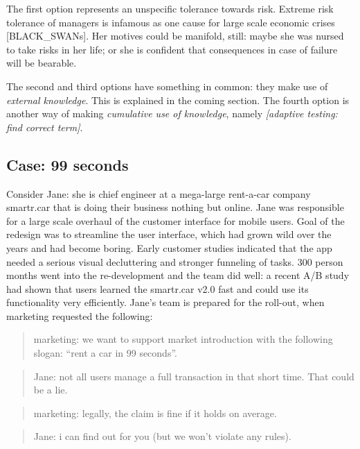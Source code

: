 \documentclass[]{svmono}
\theoremstyle{definition}
\theoremstyle{definition}
\theoremstyle{definition}
\theoremstyle{remark}
\begin{document}
The first option represents an unspecific tolerance towards risk.
Extreme risk tolerance of managers is infamous as one cause for large
scale economic crises {[}BLACK\_SWANs{]}. Her motives could be manifold,
still: maybe she was nursed to take risks in her life; or she is
confident that consequences in case of failure will be bearable.

The second and third options have something in common: they make use of
\emph{external knowledge}. This is explained in the coming section. The
fourth option is another way of making \emph{cumulative use of
knowledge}, namely \emph{{[}adaptive testing: find correct term{]}}.

\subsection{Case: 99 seconds}\label{case99}

Consider Jane: she is chief engineer at a mega-large rent-a-car company
smartr.car that is doing their business nothing but online. Jane was
responsible for a large scale overhaul of the customer interface for
mobile users. Goal of the redesign was to streamline the user interface,
which had grown wild over the years and had become boring. Early
customer studies indicated that the app needed a serious visual
decluttering and stronger funneling of tasks. 300 person months went
into the re-development and the team did well: a recent A/B study had
shown that users learned the smartr.car v2.0 fast and could use its
functionality very efficiently. Jane's team is prepared for the
roll-out, when marketing requested the following:

\begin{quote}
marketing: we want to support market introduction with the following
slogan: ``rent a car in 99 seconds''.
\end{quote}

\begin{quote}
Jane: not all users manage a full transaction in that short time. That
could be a lie.
\end{quote}

\begin{quote}
marketing: legally, the claim is fine if it holds on average.
\end{quote}

\begin{quote}
Jane: i can find out for you (but we won't violate any rules).
\end{quote}
\end{document}
